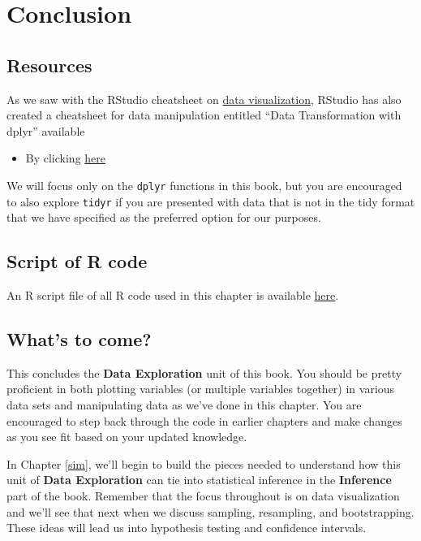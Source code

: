 \documentclass[]{tufte-book}
\providecommand{\tightlist}{%
  \setlength{\itemsep}{0pt}\setlength{\parskip}{0pt}}
\theoremstyle{definition}
\theoremstyle{definition}
\theoremstyle{remark}
\begin{document}
\section{Conclusion}\label{conclusion-1}

\subsection{Resources}\label{resources-1}

As we saw with the RStudio cheatsheet on
\href{https://www.rstudio.com/wp-content/uploads/2016/11/ggplot2-cheatsheet-2.1.pdf}{data
visualization}, RStudio has also created a cheatsheet for data
manipulation entitled ``Data Transformation with dplyr'' available

\begin{itemize}
\tightlist
\item
  By clicking
  \href{https://github.com/rstudio/cheatsheets/raw/master/source/pdfs/data-transformation-cheatsheet.pdf}{here}
\end{itemize}

We will focus only on the \texttt{dplyr} functions in this book, but you
are encouraged to also explore \texttt{tidyr} if you are presented with
data that is not in the tidy format that we have specified as the
preferred option for our purposes.

\subsection{Script of R code}\label{script-of-r-code-1}

An R script file of all R code used in this chapter is available
\href{http://ismayc.github.io/moderndiver-book/scripts/05-manip.R}{here}.

\subsection{What's to come?}\label{whats-to-come-2}

This concludes the \textbf{Data Exploration} unit of this book. You
should be pretty proficient in both plotting variables (or multiple
variables together) in various data sets and manipulating data as we've
done in this chapter. You are encouraged to step back through the code
in earlier chapters and make changes as you see fit based on your
updated knowledge.

In Chapter \ref{sim}, we'll begin to build the pieces needed to
understand how this unit of \textbf{Data Exploration} can tie into
statistical inference in the \textbf{Inference} part of the book.
Remember that the focus throughout is on data visualization and we'll
see that next when we discuss sampling, resampling, and bootstrapping.
These ideas will lead us into hypothesis testing and confidence
intervals.
\end{document}

